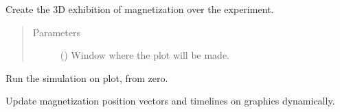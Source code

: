 \documentclass[a4paper,10pt,english]{sphinxmanual}
\begin{document}
\begin{fulllineitems}
\begin{fulllineitems}
\end{fulllineitems}


\begin{fulllineitems}
\label{\detokenize{autodoc/mrsprint/mrsprint.simulator:mrsprint.simulator.plot.Plot.plotSpin}}
Create the 3D exhibition of magnetization over the experiment.
\begin{quote}\begin{description}
\item[{Parameters}] \leavevmode
{} () \textendash{} Window where the plot will be made.

\end{description}\end{quote}

\end{fulllineitems}


\begin{fulllineitems}
\label{\detokenize{autodoc/mrsprint/mrsprint.simulator:mrsprint.simulator.plot.Plot.run}}
Run the simulation on plot, from zero.

\end{fulllineitems}


\begin{fulllineitems}
\label{\detokenize{autodoc/mrsprint/mrsprint.simulator:mrsprint.simulator.plot.Plot.update}}
Update magnetization position vectors and timelines on graphics dynamically.

\end{fulllineitems}


\end{fulllineitems}

\end{document}
